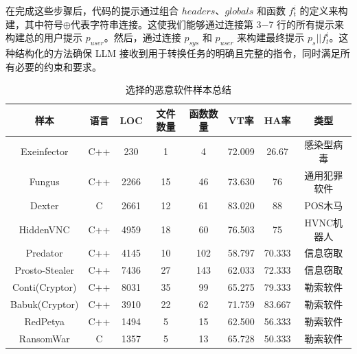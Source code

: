 在完成这些步骤后，代码的提示通过组合 $headers$、$globals$ 和函数 $f_{t}^{i}$ 的定义来构建，其中符号$\oplus$代表字符串连接。这使我们能够通过连接第 3−7 行的所有提示来构建总的用户提示 $p_{user}$。然后，通过连接 $p_{sys}$ 和 $p_{user}$ 来构建最终提示 $p_{s}||f_{t}^{i}$。这种结构化的方法确保 LLM 接收到用于转换任务的明确且完整的指令，同时满足所有必要的约束和要求。

\begin{table}[htbp]
	\centering
	\caption{选择的恶意软件样本总结}
	\label{tab:4.1}
	\begin{tabular*}{\textwidth}{@{\extracolsep{\fill}}cccccccc}
		\toprule
		样本 & 语言 & LOC & 文件数量 & 函数数量 & VT率 & HA率 & 类型 \\
		\midrule
		Exeinfector & C++ & 230 & 1 & 4 & 72.009 & 26.67 & 感染型病毒 \\
		Fungus & C++ & 2266 & 15 & 46 & 73.630 & 76 & 通用犯罪软件 \\
		Dexter & C & 2661 & 12 & 61 & 83.020 & 88 & POS木马 \\
		HiddenVNC & C++ & 4959 & 18 & 60 & 76.503 & 75 & HVNC机器人 \\
		Predator & C++ & 4145 & 10 & 102 & 58.797 & 70.333 & 信息窃取 \\
		Prosto-Stealer & C++ & 7436 & 27 & 143 & 62.033 & 72.333 & 信息窃取 \\
        Conti(Cryptor) & C++ & 8031 & 35 & 99 & 65.275 & 79.333 & 勒索软件 \\
        Babuk(Cryptor) & C++ & 3910 & 22 & 62 & 71.759 & 83.667 & 勒索软件 \\
        RedPetya & C++ & 1494 & 5 & 15 & 62.500 & 56.333 & 勒索软件 \\
        RansomWar & C & 1357 & 5 & 13 & 65.728 & 50.333 & 勒索软件 \\
		\bottomrule
	\end{tabular*}
\end{table}